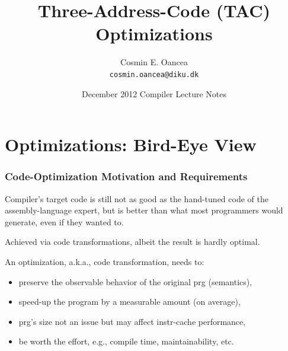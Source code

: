 \documentclass{beamer}
\title[TAC Optim.]{Three-Address-Code (TAC) Optimizations}
\author[C.~Oancea]{Cosmin E. Oancea\\{\tt cosmin.oancea@diku.dk}}
\institute{Department of Computer Science (DIKU)\\University of Copenhagen}
\date[December 2012]{December 2012 Compiler Lecture Notes}
\renewcommand{\emph}[1]{\textcolor{structure}{#1}}
\newcommand{\emp}[1]{\textcolor{DikuRed}{ #1}}
\begin{document}
\titleslide



\begin{frame}[fragile]
	\tableofcontents
\end{frame}


\section{Optimizations: Bird-Eye View}

\begin{frame}\frametitle{Code-Optimization Motivation and Requirements}

Compiler's target code is still \emp{not as good} as the hand-tuned code of
the assembly-language \emp{expert}, but is \emph{better} than what \emph{most
programmers} would generate, even if they wanted to.

\bigskip

Achieved via code transformations, albeit the result is hardly optimal.

\bigskip
\pause

\emp{An optimization}, a.k.a., code transformation, \emp{needs to}:


\begin{itemize}

\item \alert{preserve the observable behavior of the original prg (semantics),}\smallskip

\item speed-up the program by a measurable amount (on average),\smallskip

\item prg's size not an issue but may affect instr-cache performance,\smallskip

\item be worth the effort, e.g., compile time, maintainability, etc.

\end{itemize}

\end{frame}
\end{document}
